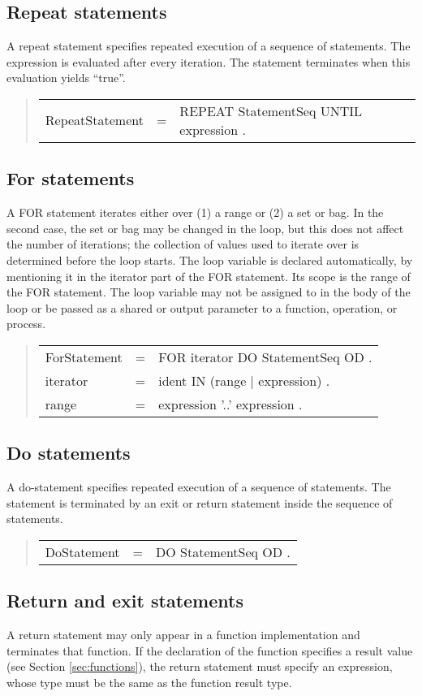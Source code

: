 \documentclass[10pt]{article}
\newenvironment{grammar}
{\begin{quote} \begin{tabular}{p{3.8cm} l l}}
{\end{tabular}\end{quote}}
\begin{document}
\subsection{Repeat statements}

A repeat statement specifies repeated execution of a sequence of statements.
The expression is evaluated after every iteration.
The statement terminates when this evaluation yields ``true''.
\begin{grammar}
RepeatStatement & = & REPEAT StatementSeq UNTIL expression .
\end{grammar}
\subsection{For statements}

A FOR statement iterates either over (1) a range or (2) a set or bag.
In the second case, the set or bag may be changed in the loop,
but this does not affect the number of iterations; the collection of
values used to iterate over is determined before the loop starts.
The loop variable is declared automatically, by mentioning it in the 
iterator part of the FOR statement. Its scope is the range of the FOR
statement.
The loop variable may not be assigned to in the body of the loop or be passed
as a shared or output parameter to a function, operation, or process.
\begin{grammar}
ForStatement & = & FOR iterator DO StatementSeq OD . \\
iterator & = & ident IN (range $|$ expression) . \\
range & = & expression '..' expression .
\end{grammar}
\subsection{Do statements}

A do-statement specifies repeated execution of a sequence of statements.
The statement is terminated by an exit or return statement inside the
sequence of statements.
\begin{grammar}
DoStatement & = & DO StatementSeq OD .
\end{grammar}
\subsection{Return and exit statements}

A return statement may only appear in a function implementation
and terminates that function.
If the declaration of the function specifies a result value (see
Section \ref{sec:functions}),
the return statement must specify an expression, whose type must
be the same as the function result type.
\end{document}
